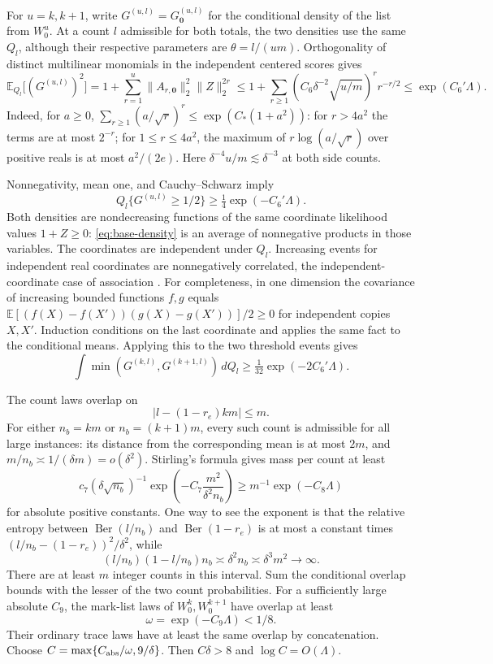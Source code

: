 For \(u=k,k+1\), write \(G^{(u,l)}=G_{\mathbf0}^{(u,l)}\) for the conditional density of the list from \(W_0^u\). At a count \(l\) admissible for both totals, the two densities use the same \(Q_l\), although their respective parameters are \(\theta=l/(um)\). Orthogonality of distinct multilinear monomials in the independent centered scores gives
\[
 \mathbb E_{Q_l}\bigl[(G^{(u,l)})^2\bigr]
 =1+\sum_{r=1}^{u}\|A_{r,\mathbf0}\|_2^2\|Z\|_2^{2r}
 \le1+\sum_{r\ge1}
       (C_6\delta^{-2}\sqrt{u/m})^r r^{-r/2}
 \le\exp(C_6'\Lambda).
\]
Indeed, for \(a\ge0\),
\(\sum_{r\ge1}(a/\sqrt r)^r\le\exp(C_*(1+a^2))\): for \(r>4a^2\) the terms are at most \(2^{-r}\); for \(1\le r\le4a^2\), the maximum of \(r\log(a/\sqrt r)\) over positive reals is at most \(a^2/(2e)\). Here \(\delta^{-4}u/m\lesssim\delta^{-3}\) at both side counts.

Nonnegativity, mean one, and Cauchy--Schwarz imply
\[
 Q_l\{G^{(u,l)}\ge1/2\}\ge\tfrac14\exp(-C_6'\Lambda).
\]
Both densities are nondecreasing functions of the same coordinate likelihood values \(1+Z\ge0\): \eqref{eq:base-density} is an average of nonnegative products in those variables. The coordinates are independent under \(Q_l\). Increasing events for independent real coordinates are nonnegatively correlated, the independent-coordinate case of association \citep[Theorem~2.1]{EPW1967}. For completeness, in one dimension the covariance of increasing bounded functions \(f,g\) equals
\(\mathbb E[(f(X)-f(X'))(g(X)-g(X'))]/2\ge0\) for independent copies \(X,X'\). Induction conditions on the last coordinate and applies the same fact to the conditional means. Applying this to the two threshold events gives
\[
 \int\min(G^{(k,l)},G^{(k+1,l)})\,dQ_l
 \ge\tfrac1{32}\exp(-2C_6'\Lambda).
\]

The count laws overlap on
\[
 |l-(1-r_e)km|\le m.
\]
For either \(n_b=km\) or \(n_b=(k+1)m\), every such count is admissible for all large instances: its distance from the corresponding mean is at most \(2m\), and
\(m/n_b\asymp1/(\delta m)=o(\delta^2)\).
Stirling's formula gives mass per count at least
\[
 c_7(\delta\sqrt{n_b})^{-1}
       \exp\!\left(-C_7\frac{m^2}{\delta^2n_b}\right)
 \ge m^{-1}\exp(-C_8\Lambda)
\]
for absolute positive constants. One way to see the exponent is that the relative entropy between
\(\operatorname{Ber}(l/n_b)\) and \(\operatorname{Ber}(1-r_e)\) is at most a constant times
\((l/n_b-(1-r_e))^2/\delta^2\), while
\[
 (l/n_b)(1-l/n_b)n_b\asymp\delta^2n_b
 \asymp\delta^3m^2\longrightarrow\infty.
\]
There are at least \(m\) integer counts in this interval. Sum the conditional overlap bounds with the lesser of the two count probabilities. For a sufficiently large absolute \(C_9\), the mark-list laws of \(W_0^k,W_0^{k+1}\) have overlap at least
\[
 \omega=\exp(-C_9\Lambda)<1/8.
\]
Their ordinary trace laws have at least the same overlap by concatenation. Choose
\(C=\max\{C_{\rm abs}/\omega,9/\delta\}\). Then \(C\delta>8\) and \(\log C=O(\Lambda)\).

